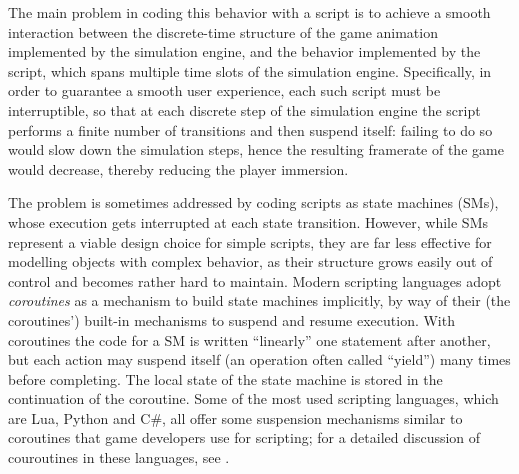 The main problem in coding this behavior with a script is to achieve a
smooth interaction between the discrete-time structure of the game
animation implemented by the simulation engine, and the behavior
implemented by the script, which spans multiple time slots of the
simulation engine. Specifically, in order to guarantee a smooth user
experience, each such script must be interruptible, so that at 
each discrete step of the simulation engine the script performs a
finite number of transitions and then suspend itself: failing to do 
so would slow down the simulation steps, hence the resulting framerate
of the game would decrease, thereby reducing the player immersion. 

The problem is sometimes addressed by coding scripts as state machines
(SMs), whose execution gets interrupted at each state transition. 
However, while SMs represent a viable design choice for simple
scripts, they are far less effective for modelling objects with
complex behavior, as their structure grows easily out of control and
becomes rather hard to maintain. Modern scripting languages adopt 
\textit{coroutines} as a mechanism to build state machines
implicitly, by way of their (the coroutines') built-in mechanisms to
suspend and resume execution. With coroutines the 
code for a SM is written ``linearly'' one statement after another, but
each action may suspend itself (an operation often called ``yield'')
many times before completing. The local state of the state machine
is stored in the continuation of the coroutine. Some of the most used 
scripting languages, which are Lua, Python and C\#, all offer some
suspension mechanisms similar to coroutines that game developers use
for scripting; for a detailed discussion of couroutines in these
languages, see \cite{PYTHON_COROUTINES,LUA_COROUTINES,CSHARP_YIELD}. 

